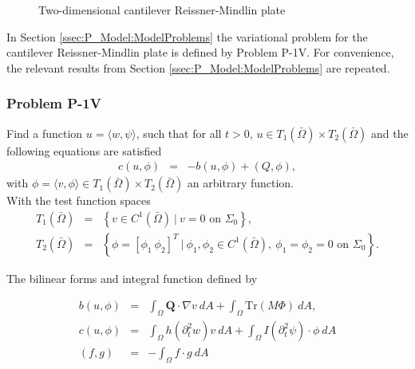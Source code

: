 \documentclass[../../main.tex]{subfiles}
\begin{document}
\begin{figure}[h!]
	\caption{Two-dimensional cantilever Reissner-Mindlin plate}
\end{figure}
\FloatBarrier

In Section \ref{ssec:P_Model:ModelProblems} the variational problem for the cantilever Reissner-Mindlin plate is defined by Problem P-1V. For convenience, the relevant results from Section \ref{ssec:P_Model:ModelProblems} are repeated.

\subsubsection{Problem P-1V}
Find a function $u = \langle w, \psi \rangle$, such that for all $t>0$, $u \in T_1({\bar{\Omega}}) \times T_2({\bar{\Omega}})$ and the following equations are satisfied
\begin{eqnarray}
	c(u,\phi) &=& -b(u,\phi) + (Q,\phi), \label{eq:P_Model:ProblemP1V1}
\end{eqnarray} with $\phi = \langle v, \phi \rangle  \in T_1({\bar{\Omega}}) \times T_2({\bar{\Omega}})$ an arbitrary function.\\

With the test function spaces
\begin{eqnarray*}
	T_1(\bar{\Omega}) & = & \left \{v \in C^1(\bar{\Omega})\ | \ v = 0 \textrm{ on } \Sigma_0\right\},\\
	T_2(\bar{\Omega}) & = & \left \{ \phi = \left[ \phi_1 \ \phi_2 \right]^T \ | \ \phi_1, \phi_2 \in C^1(\bar{\Omega}), \ \phi_1 = \phi_2 = 0 \textrm{ on } \Sigma_0 \right\}.
\end{eqnarray*}

The bilinear forms and integral function defined by

\begin{eqnarray*}
	b(u,\phi) & = & \int_\Omega \boldsymbol{Q} \cdot \nabla v \ dA + \int_{\Omega} \textrm{Tr}(M\Phi) \ dA,\\
	c(u,\phi) & = & \int_\Omega h (\partial_t^2 w) v \ dA + \int_\Omega I (\partial_t^2 \psi) \cdot \phi \ dA \\
	(f,g) &=& -\int_{\Omega} f\cdot g \ dA \label{eq:2D_Model:Bilinear_int}
\end{eqnarray*}
\end{document}
